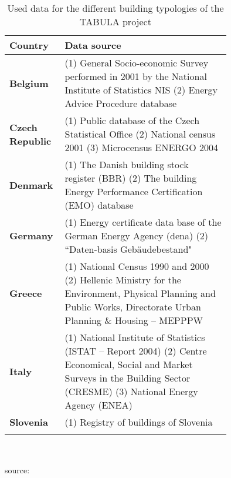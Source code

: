 \begin{table}[htbp] 
  \centering
\caption[Used data for the different building typologies of the TABULA project]{
  Used data for the different building typologies of the TABULA
  project
  }\label{tab:TABULA}%
    \begin{tabular}{l p{0.75\linewidth}}
    \toprule
    \addlinespace
\textbf{Country} & Data source\\
	\midrule
    \addlinespace
\textbf{Belgium} &
  (1) General Socio-economic Survey performed in 2001 by the
	      National Institute of Statistics NIS
  (2) Energy Advice Procedure database
  \\
\textbf{Czech Republic}&
  (1) Public database of the Czech Statistical Office
  (2) National census 2001
  (3) Microcensus ENERGO 2004
  \\
\textbf{Denmark}&
  (1) The Danish building stock register (BBR)
  (2) The building Energy Performance Certification (EMO) database
  \\
\textbf{Germany}&
  (1) Energy certificate data base of the German Energy Agency (dena)
  (2)  ``Daten-basis Gebäudebestand"~\cite{Diefenbach.2010}
  \\
\textbf{Greece}&
  (1) National Census 1990 and 2000
  (2) Hellenic Ministry for the Environment, Physical Planning and Public
		  Works, Directorate Urban Planning \& Housing -- MEPPPW
          \\
\textbf{Italy}&	
  (1) National Institute of Statistics (ISTAT -- Report 2004)
  (2) Centre Economical, Social and Market Surveys in the Building Sector
  (CRESME)
  (3) National Energy Agency (ENEA)\\
\textbf{Slovenia}&
  (1) Registry of buildings of Slovenia
      \\
	\addlinespace
	\bottomrule
    \end{tabular}\\
\begin{footnotesize}
    source:~\cite{TABULAProjectTeam.2012c}
\end{footnotesize}
\end{table}%
